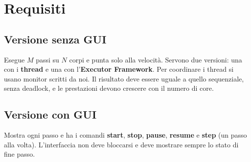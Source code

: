 %
%
\section{Requisiti}
\label{sec:requisiti}

\subsection{Versione senza GUI}
Esegue $M$ passi su $N$ corpi e punta solo alla velocità.
Servono due versioni: una con i \textbf{thread} e una con l'\textbf{Executor Framework}.
Per coordinare i thread si usano monitor scritti da noi.
Il risultato deve essere uguale a quello sequenziale, senza deadlock, e le prestazioni devono crescere con il numero di core.

\subsection{Versione con GUI}
Mostra ogni passo e ha i comandi \textbf{start}, \textbf{stop}, \textbf{pause}, \textbf{resume} e \textbf{step} (un passo alla volta).
L'interfaccia non deve bloccarsi e deve mostrare sempre lo stato di fine passo.

